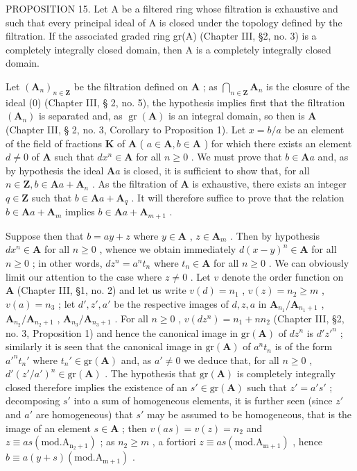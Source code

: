 PROPOSITION 15. Let A be a filtered ring whose filtration is exhaustive and such that every principal ideal of A is closed under the topology defined by the filtration. If the associated graded ring gr(A) (Chapter III, §2, no. 3) is a completely integrally closed domain, then A is a completely integrally closed domain.

Let \((\mathbf{A}_n)_{n\in \mathbf{Z}}\) be the filtration defined on \(\mathbf{A}\) ; as \(\bigcap_{n\in \mathbf{Z}}\mathbf{A}_n\) is the closure of the ideal (0) (Chapter III, § 2, no. 5), the hypothesis implies first that the filtration \((\mathbf{A}_n)\) is separated and, as \(\operatorname{gr}(\mathbf{A})\) is an integral domain, so then is \(\mathbf{A}\) (Chapter III, § 2, no. 3, Corollary to Proposition 1). Let \(x = b / a\) be an element of the field of fractions \(\mathbf{K}\) of \(\mathbf{A}\) ( \(a\in \mathbf{A}, b\in \mathbf{A}\) ) for which there exists an element \(d\neq 0\) of \(\mathbf{A}\) such that \(dx^n\in \mathbf{A}\) for all \(n\geqslant 0\) . We must prove that \(b\in \mathbf{A}a\) and, as by hypothesis the ideal \(\mathbf{A}a\) is closed, it is sufficient to show that, for all \(n\in \mathbf{Z}, b\in \mathbf{A}a + \mathbf{A}_n\) . As the filtration of \(\mathbf{A}\) is exhaustive, there exists an integer \(q\in \mathbf{Z}\) such that \(b\in \mathbf{A}a + \mathbf{A}_q\) . It will therefore suffice to prove that the relation \(b\in \mathbf{A}a + \mathbf{A}_m\) implies \(b\in \mathbf{A}a + \mathbf{A}_{m + 1}\) .

Suppose then that \(b = ay + z\) where \(y \in \mathbf{A}\) , \(z \in \mathbf{A}_m\) . Then by hypothesis \(dx^n \in \mathbf{A}\) for all \(n \geqslant 0\) , whence we obtain immediately \(d(x - y)^n \in \mathbf{A}\) for all \(n \geqslant 0\) ; in other words, \(dz^n = a^n t_n\) where \(t_n \in \mathbf{A}\) for all \(n \geqslant 0\) . We can obviously limit our attention to the case where \(z \neq 0\) . Let \(v\) denote the order function on \(\mathbf{A}\) (Chapter III, §1, no. 2) and let us write \(v(d) = n_1\) , \(v(z) = n_2 \geqslant m\) , \(v(a) = n_3\) ; let \(d', z', a'\) be the respective images of \(d, z, a\) in \(\mathbf{A}_{n_1}/\mathbf{A}_{n_1+1}\) , \(\mathbf{A}_{n_2}/\mathbf{A}_{n_2+1}\) , \(\mathbf{A}_{n_3}/\mathbf{A}_{n_3+1}\) . For all \(n \geqslant 0\) , \(v(dz^n) = n_1 + nn_2\) (Chapter III, §2, no. 3, Proposition 1) and hence the canonical image in \(\mathrm{gr}(\mathbf{A})\) of \(dz^n\) is \(d'z'^n\) ; similarly it is seen that the canonical image in \(\mathrm{gr}(\mathbf{A})\) of \(a^n t_n\) is of the form \(a'^n t_n'\) where \(t_n' \in \mathrm{gr}(\mathbf{A})\) and, as \(a' \neq 0\) we deduce that, for all \(n \geqslant 0\) , \(d'(z'/a')^n \in \mathrm{gr}(\mathbf{A})\) . The hypothesis that \(\mathrm{gr}(\mathbf{A})\) is completely integrally closed therefore implies the existence of an \(s' \in \mathrm{gr}(\mathbf{A})\) such that \(z' = a's'\) ; decomposing \(s'\) into a sum of homogeneous elements, it is further seen (since \(z'\) and \(a'\) are homogeneous) that \(s'\) may be assumed to be homogeneous, that is the image of an element \(s \in \mathbf{A}\) ; then \(v(as) = v(z) = n_2\) and \(z \equiv as (\mathrm{mod. A_{n_2+1}})\) ; as \(n_2 \geqslant m\) , a fortiori \(z \equiv as (\mathrm{mod. A_{m+1}})\) , hence \(b \equiv a(y + s) (\mathrm{mod. A_{m+1}})\) .

